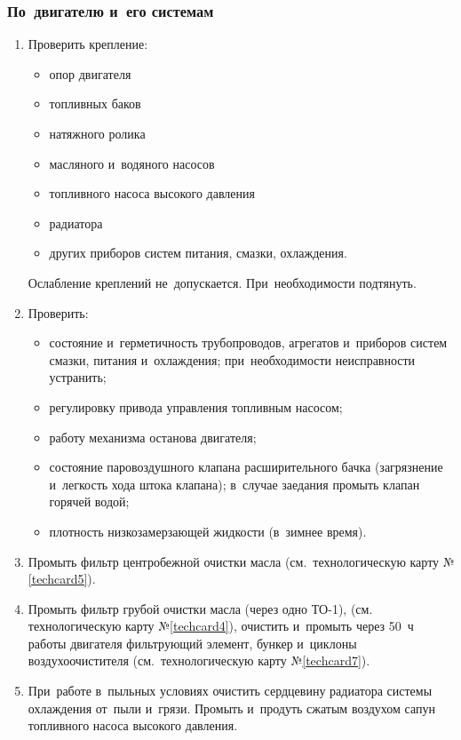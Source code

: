 \subsubsection{По~двигателю и~его системам}
\begin{enumerate}
    \item Проверить крепление: 
    \begin{itemize}
        \item опор двигателя
        \item топливных баков
        \item натяжного ролика
        \item масляного и~водяного насосов
        \item топливного насоса высокого давления
        \item радиатора
        \item других приборов систем питания, смазки, охлаждения.
    \end{itemize}
    Ослабление креплений не~допускается. При~необходимости подтянуть.
    
    \item Проверить:
        \begin{itemize}
            \item состояние и~герметичность трубопроводов, агрегатов и~приборов систем смазки, питания и~охлаждения; при~необходимости неисправности устранить; 
            \item регулировку привода управления топливным насосом; 
            \item работу механизма останова двигателя; 
            \item состояние паровоздушного клапана расширительного бачка (загрязнение и~легкость хода штока клапана); в~случае заедания промыть клапан горячей водой; 
            \item плотность низкозамерзающей жидкости (в~зимнее время). 
            
        \end{itemize} 
    \item Промыть фильтр центробежной очистки масла (см.~технологическую карту №\ref{techcard5}). 
    \item Промыть фильтр грубой очистки масла (через одно ТО-1), (см.~ технологическую карту №\ref{techcard4}), очистить и~промыть через 50~ч работы двигателя фильтрующий элемент, бункер и~циклоны воздухоочистителя (см.~технологическую карту №\ref{techcard7}). 
    \item При~работе в~пыльных условиях очистить сердцевину радиатора системы охлаждения от~пыли и~грязи. Промыть и~продуть сжатым воздухом сапун топливного насоса высокого давления. 
\end{enumerate}

